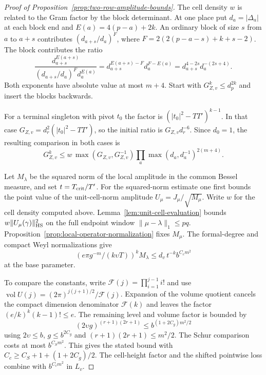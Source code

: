 \begin{proof}[Proof of Proposition~\ref{prop:two-row-amplitude-bounds}]
The cell density \(w\) is related to the Gram factor by the
block determinant. At one place put \(d_a=|\Delta_a|\) at
each block end and \(E(a)=4(p-a)+2k\). An ordinary block of
size \(s\) from \(a\) to \(a+s\) contributes
\((d_{a+s}/d_a)^F\), where
\(F=2(2(p-a-s)+k+s-2)\).
The block contributes the ratio
\[
 \frac{d_{a+s}^{E(a+s)}}{(d_{a+s}/d_a)^F d_a^{E(a)}}=
 d_{a+s}^{E(a+s)-F}d_a^{F-E(a)}
     =d_{a+s}^{4-2s}d_a^{-(2s+4)} .
\]
Both exponents have absolute value at most \(m+4\). Start with
\(G_{Z,v}^k\le d_p^{2k}\) and insert the blocks backwards.

For a terminal singleton with pivot \(t_0\) the factor is
\((|t_0|^2-TT')^{k-1}\).
In that case \(G_{Z,v}=d_r^2(|t_0|^2-TT')\), so the
initial ratio is \(G_{Z,v}d_r^{-6}\).
Since \(d_0=1\), the resulting comparison in both cases is
\[
 G_{Z,v}^k\le w\,\max(G_{Z,v},G_{Z,v}^{-1})
       \prod_a\max(d_a,d_a^{-1})^{2(m+4)} .
\]

Let \(M_\lambda\) be the squared norm of the local amplitude
in the common Bessel measure, and set \(t=T_{\rm crit}/T'\).
For the squared-norm estimate one first bounds the point value
of the unit-cell-norm amplitude \(U_\mu=J_\mu/\sqrt{M_\mu}\).
Write \(w\) for the cell density computed above.
Lemma~\ref{lem:unit-cell-evaluation} bounds
\(w\|U_\mu(\gamma)\|_{\rm HS}^2\) on the full endpoint
window \(\|\mu-\lambda\|_1\le pq\).
Proposition~\ref{prop:local-operator-normalization} fixes \(M_\mu\).
The formal-degree
and compact Weyl normalizations give
\[
 (e\pi g^{-m}/(k\upsilon T))^k M_\lambda
       \le d_v\,t^{-k}b^{C_c m^2}
\]
at the base parameter.

To compare the constants, write
\(\mathcal F(j)=\prod_{i=1}^{j-1}i!\) and use
\(\operatorname{vol}U(j)=(2\pi)^{j(j+1)/2}/\mathcal F(j)\).
Expansion of the volume quotient cancels the compact
dimension denominator \(\mathcal F(k)\) and leaves the
factor \((e/k)^k(k-1)!\le e\). The remaining level and volume
factor is bounded by
\[
 (2\upsilon g)^{(r+1)(2r+1)}
       \le b^{(1+2C_g)m^2/2}
\]
using \(2\upsilon\le b\), \(g\le b^{2C_g}\) and
\((r+1)(2r+1)\le m^2/2\). The Schur comparison costs at most
\(b^{C_Sm^2}\). This gives the stated
bound with \(C_c\ge C_S+1+(1+2C_g)/2\).
The cell-height factor and the shifted pointwise loss
combine with \(b^{C_c m^2}\) in \(L_v\).


\end{proof}

